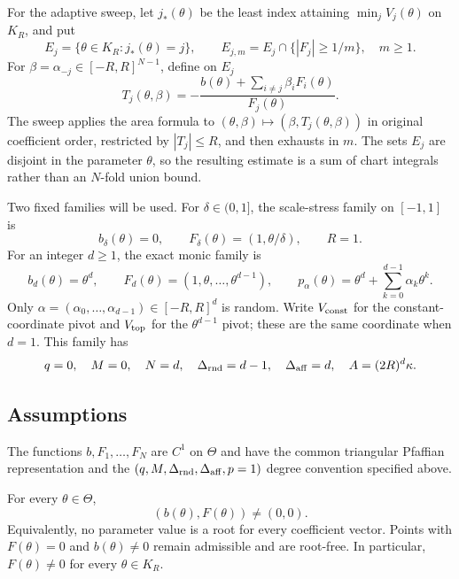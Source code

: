 For the adaptive sweep, let $j_*(\theta)$ be the least index attaining
$\min_jV_j(\theta)$ on $K_R$, and put
\[
E_j=\{\theta\in K_R:j_*(\theta)=j\},
\qquad
E_{j,m}=E_j\cap\{|F_j|\geq 1/m\},\quad m\geq1.
\]
For $\beta=\alpha_{-j}\in[-R,R]^{N-1}$, define on $E_j$
\[
T_j(\theta,\beta)
=-\frac{b(\theta)+\sum_{i\neq j}\beta_iF_i(\theta)}{F_j(\theta)}.
\]
The sweep applies the area formula to
$(\theta,\beta)\mapsto(\beta,T_j(\theta,\beta))$ in original coefficient
order, restricted by $|T_j|\leq R$, and then exhausts in $m$.  The sets
$E_j$ are disjoint in the parameter $\theta$, so the resulting estimate is
a sum of chart integrals rather than an $N$-fold union bound.

Two fixed families will be used.  For $\delta\in(0,1]$, the scale-stress
family on $[-1,1]$ is
\[
b_\delta(\theta)=0,
\qquad
F_\delta(\theta)=(1,\theta/\delta),
\qquad R=1.
\]
For an integer $d\geq1$, the exact monic family is
\[
b_d(\theta)=\theta^d,
\qquad
F_d(\theta)=(1,\theta,\ldots,\theta^{d-1}),
\qquad
p_\alpha(\theta)=\theta^d+\sum_{k=0}^{d-1}\alpha_k\theta^k.
\]
Only $\alpha=(\alpha_0,\ldots,\alpha_{d-1})\in[-R,R]^d$ is random.
Write $V_{\rm const}$ for the constant-coordinate pivot and
$V_{\rm top}$ for the $\theta^{d-1}$ pivot; these are the same coordinate
when $d=1$.  This family has
\[
q=0,
\quad M=0,
\quad N=d,
\quad \Delta_{\rm rnd}=d-1,
\quad \Delta_{\rm aff}=d,
\quad A=(2R)^d\kappa.
\]

\subsection{Assumptions}

\begin{assumption}
\label{assump:shared-pfaffian-chain}
The functions $b,F_1,\ldots,F_N$ are $C^1$ on $\Theta$ and have the common
triangular Pfaffian representation and the
$(q,M,\Delta_{\rm rnd},\Delta_{\rm aff},p=1)$ degree convention specified
above.
\end{assumption}

\begin{assumption}
\label{assump:no-forced-root}
For every $\theta\in\Theta$,
\[
(b(\theta),F(\theta))\neq(0,0).
\]
Equivalently, no parameter value is a root for every coefficient vector.
Points with $F(\theta)=0$ and $b(\theta)\neq0$ remain admissible and are
root-free.  In particular, $F(\theta)\neq0$ for every $\theta\in K_R$.
\end{assumption}

